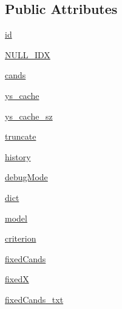 \subsection*{Public Attributes}
\begin{DoxyCompactItemize}
\item 
\hyperlink{classparlai_1_1agents_1_1starspace_1_1starspace_1_1StarspaceAgent_a78a530a11ff03bce1e41831e560163bc}{id}
\item 
\hyperlink{classparlai_1_1agents_1_1starspace_1_1starspace_1_1StarspaceAgent_aee34a5667cc7acbeaacc5b9563487087}{N\+U\+L\+L\+\_\+\+I\+DX}
\item 
\hyperlink{classparlai_1_1agents_1_1starspace_1_1starspace_1_1StarspaceAgent_a1986fb638717b81936ada2bf418b259f}{cands}
\item 
\hyperlink{classparlai_1_1agents_1_1starspace_1_1starspace_1_1StarspaceAgent_a050c7f6c495b0bccc9c29caa5c83d0ae}{ys\+\_\+cache}
\item 
\hyperlink{classparlai_1_1agents_1_1starspace_1_1starspace_1_1StarspaceAgent_a6f300619fe9d0814ed612db691ec9dab}{ys\+\_\+cache\+\_\+sz}
\item 
\hyperlink{classparlai_1_1agents_1_1starspace_1_1starspace_1_1StarspaceAgent_a9c521ca705e241271b6bb34bd5b22bea}{truncate}
\item 
\hyperlink{classparlai_1_1agents_1_1starspace_1_1starspace_1_1StarspaceAgent_a652778d6927eaf8633dc1d8cbeab9409}{history}
\item 
\hyperlink{classparlai_1_1agents_1_1starspace_1_1starspace_1_1StarspaceAgent_a668af7bc10cad919c8deff9b4f82e6d9}{debug\+Mode}
\item 
\hyperlink{classparlai_1_1agents_1_1starspace_1_1starspace_1_1StarspaceAgent_a650dfa9753ea9d80f8a81823d9fdc50a}{dict}
\item 
\hyperlink{classparlai_1_1agents_1_1starspace_1_1starspace_1_1StarspaceAgent_a1bf1dacfd9d58385bd7da5bcd574cb0f}{model}
\item 
\hyperlink{classparlai_1_1agents_1_1starspace_1_1starspace_1_1StarspaceAgent_a384ddfe5e4ad6c08243e6b8b1136ecbc}{criterion}
\item 
\hyperlink{classparlai_1_1agents_1_1starspace_1_1starspace_1_1StarspaceAgent_a787ee6df16019fb6b9f78c7137070056}{fixed\+Cands}
\item 
\hyperlink{classparlai_1_1agents_1_1starspace_1_1starspace_1_1StarspaceAgent_a152e023a9ed4b162ab66e5d2e97f5f4e}{fixedX}
\item 
\hyperlink{classparlai_1_1agents_1_1starspace_1_1starspace_1_1StarspaceAgent_a13eba6e6eb10b366d145863b538571b7}{fixed\+Cands\+\_\+txt}

\end{DoxyCompactItemize}
